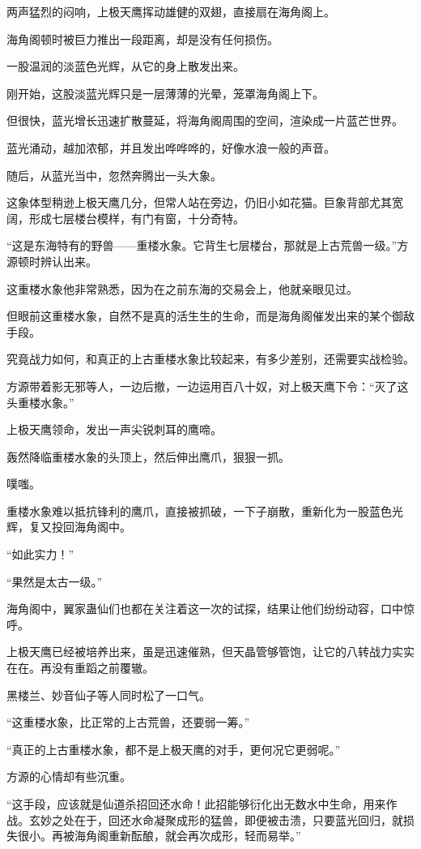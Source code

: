 \begin{this_body}
两声猛烈的闷响，上极天鹰挥动雄健的双翅，直接扇在海角阁上。

海角阁顿时被巨力推出一段距离，却是没有任何损伤。

一股温润的淡蓝色光辉，从它的身上散发出来。

刚开始，这股淡蓝光辉只是一层薄薄的光晕，笼罩海角阁上下。

但很快，蓝光增长迅速扩散蔓延，将海角阁周围的空间，渲染成一片蓝芒世界。

蓝光涌动，越加浓郁，并且发出哗哗哗的，好像水浪一般的声音。

随后，从蓝光当中，忽然奔腾出一头大象。

这象体型稍逊上极天鹰几分，但常人站在旁边，仍旧小如花猫。巨象背部尤其宽阔，形成七层楼台模样，有门有窗，十分奇特。

“这是东海特有的野兽——重楼水象。它背生七层楼台，那就是上古荒兽一级。”方源顿时辨认出来。

这重楼水象他非常熟悉，因为在之前东海的交易会上，他就亲眼见过。

但眼前这重楼水象，自然不是真的活生生的生命，而是海角阁催发出来的某个御敌手段。

究竟战力如何，和真正的上古重楼水象比较起来，有多少差别，还需要实战检验。

方源带着影无邪等人，一边后撤，一边运用百八十奴，对上极天鹰下令：“灭了这头重楼水象。”

上极天鹰领命，发出一声尖锐刺耳的鹰啼。

轰然降临重楼水象的头顶上，然后伸出鹰爪，狠狠一抓。

噗嗤。

重楼水象难以抵抗锋利的鹰爪，直接被抓破，一下子崩散，重新化为一股蓝色光辉，复又投回海角阁中。

“如此实力！”

“果然是太古一级。”

海角阁中，翼家蛊仙们也都在关注着这一次的试探，结果让他们纷纷动容，口中惊呼。

上极天鹰已经被培养出来，虽是迅速催熟，但天晶管够管饱，让它的八转战力实实在在。再没有重蹈之前覆辙。

黑楼兰、妙音仙子等人同时松了一口气。

“这重楼水象，比正常的上古荒兽，还要弱一筹。”

“真正的上古重楼水象，都不是上极天鹰的对手，更何况它更弱呢。”

方源的心情却有些沉重。

“这手段，应该就是仙道杀招回还水命！此招能够衍化出无数水中生命，用来作战。玄妙之处在于，回还水命凝聚成形的猛兽，即便被击溃，只要蓝光回归，就损失很小。再被海角阁重新酝酿，就会再次成形，轻而易举。”


\end{this_body}
